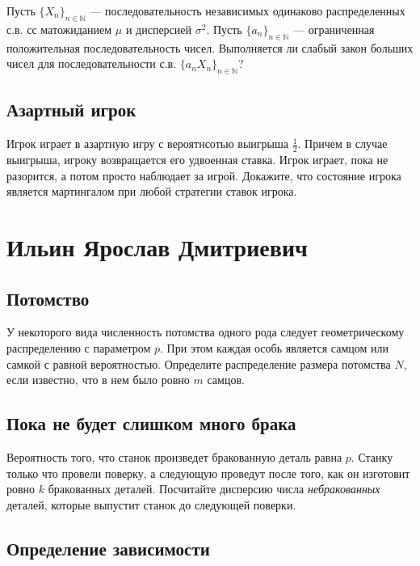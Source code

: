 \documentclass[12pt]{article}
\newcommand\N{\mathbb{N}}
\begin{document}
Пусть $\{X_n\}_{n \in \N}$ --- последовательность независимых одинаково распределенных с.в. сс матожиданием $\mu$ и дисперсией $\sigma^2$. Пусть $\{a_n\}_{n \in \N}$ --- ограниченная положительная последовательность чисел. Выполняется ли слабый закон больших чисел для последовательности с.в. $\{a_n X_n\}_{n \in \N}$?



\subsection{Азартный игрок}

Игрок играет в азартную игру с вероятнсотью выигрыша $\frac{1}{2}$. Причем в случае выигрыша, игроку возвращается его удвоенная ставка. Игрок играет, пока не разорится, а потом просто наблюдает за игрой. Докажите, что состояние игрока является мартингалом при любой стратегии ставок игрока.



\newpage
\section{Ильин Ярослав Дмитриевич}

\subsection{Потомство}

У некоторого вида численность потомства одного рода следует геометрическому распределению с параметром $p$. При этом каждая особь является самцом или самкой с равной вероятностью. Определите распределение размера потомства $N$, если известно, что в нем было ровно $m$ самцов.



\subsection{Пока не будет слишком много брака}

Вероятность того, что станок произведет бракованную деталь равна $p$. Станку только что провели поверку, а следующую проведут после того, как он изготовит ровно $k$ бракованных деталей. Посчитайте дисперсию числа \emph{небракованных} деталей, которые выпустит станок до следующей поверки.



\subsection{Определение зависимости}
\end{document}
